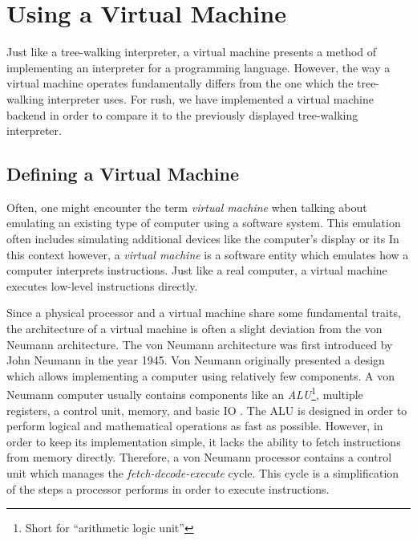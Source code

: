 \section{Using a Virtual Machine}

Just like a tree-walking interpreter, a virtual machine presents a method of implementing an interpreter for a programming language.
However, the way a virtual machine operates fundamentally differs from the one which the tree-walking interpreter uses.
For rush, we have implemented a virtual machine backend in order to compare it to the previously displayed tree-walking interpreter.

\subsection{Defining a Virtual Machine}

Often, one might encounter the term \emph{virtual machine} when talking about emulating an existing type of computer using a software system.
This emulation often includes simulating additional devices like the computer's display or its In this context however, a \emph{virtual machine} is a software entity which emulates how a computer interprets instructions.
Just like a real computer, a virtual machine executes low-level instructions directly.

Since a physical processor and a virtual machine share some fundamental traits,
the architecture of a virtual machine is often a slight deviation from the von Neumann architecture.
The von Neumann architecture was first introduced by John Neumann in the year 1945.
Von Neumann originally presented a design which allows implementing a computer using relatively few components.
A von Neumann computer usually contains components like an \emph{ALU}\footnote{Short for \enquote{arithmetic logic unit}}, multiple registers, a control unit, memory, and basic IO \cite[p.~172]{Ledin2020-yp}.
The ALU is designed in order to perform logical and mathematical operations as fast as possible.
However, in order to keep its implementation simple, it lacks the ability to fetch instructions from memory directly.
Therefore, a von Neumann processor contains a control unit which manages the \emph{fetch-decode-execute} cycle.
This cycle is a simplification of the steps a processor performs in order to execute instructions.

